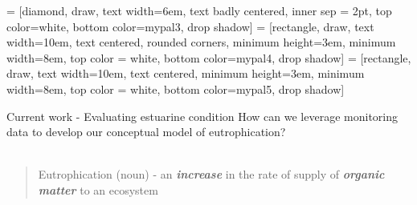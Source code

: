 \documentclass[serif]{beamer}\usepackage[]{graphicx}\usepackage[]{color}
\newcommand{\emtxt}[1]{\textbf{\textit{#1}}}
\begin{document}

 = [diamond, draw, text width=6em, text badly centered, inner sep = 2pt, top color=white, bottom color=mypal3, drop shadow]
 = [rectangle, draw, text width=10em, text centered, rounded corners, minimum height=3em, minimum width=8em, top color = white, bottom color=mypal4,  drop shadow]
 = [rectangle, draw, text width=10em, text centered, minimum height=3em, minimum width=8em, top color = white, bottom color=mypal5,  drop shadow]

\begin{frame}[t]{Current work - Evaluating estuarine condition}
How can we leverage monitoring data to develop our conceptual model of eutrophication? \\~\\
\onslide<+->
\begin{quote}
Eutrophication (noun) - an \emtxt{increase} in the rate of supply of \emtxt{organic matter} to an ecosystem\\
\end{quote}
\begin{center}
\end{center}
\end{frame}
\end{document}
